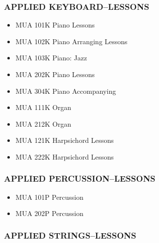 \documentclass[
  letterpaper,
]{scrbook}
\providecommand{\tightlist}{%
  \setlength{\itemsep}{0pt}\setlength{\parskip}{0pt}}
\begin{document}
\subsubsection{APPLIED KEYBOARD--LESSONS}\label{applied-keyboardlessons}

\begin{itemize}
\tightlist
\item
  MUA 101K Piano Lessons\\
\item
  MUA 102K Piano Arranging Lessons\\
\item
  MUA 103K Piano: Jazz\\
\item
  MUA 202K Piano Lessons\\
\item
  MUA 304K Piano Accompanying\\
\item
  MUA 111K Organ\\
\item
  MUA 212K Organ\\
\item
  MUA 121K Harpsichord Lessons\\
\item
  MUA 222K Harpsichord Lessons
\end{itemize}

\subsubsection{APPLIED
PERCUSSION--LESSONS}\label{applied-percussionlessons}

\begin{itemize}
\tightlist
\item
  MUA 101P Percussion\\
\item
  MUA 202P Percussion
\end{itemize}

\subsubsection{APPLIED STRINGS--LESSONS}\label{applied-stringslessons}
\end{document}
